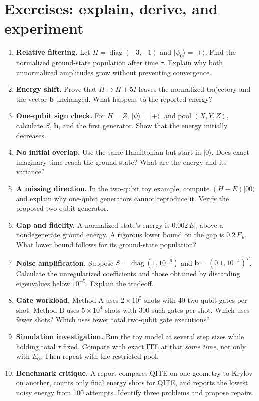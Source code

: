 \documentclass[11pt,a4paper]{article}
\newcommand{\ket}[1]{\lvert #1\rangle}
\newcommand{\Eh}{E_{\mathrm h}}
\newcommand{\lesson}[2]{\clearpage\section{#1}\label{#2}}
\begin{document}
\lesson{Exercises: explain, derive, and experiment}{sec:exercises}
\begin{enumerate}
\item \textbf{Relative filtering.} Let $H=\operatorname{diag}(-3,-1)$ and $\ket{\psi_0}=\ket{+}$. Find the normalized ground-state population after time $\tau$. Explain why both unnormalized amplitudes grow without preventing convergence.
\item \textbf{Energy shift.} Prove that $H\mapsto H+5I$ leaves the normalized trajectory and the vector $\bm b$ unchanged. What happens to the reported energy?
\item \textbf{One-qubit sign check.} For $H=Z$, $\ket{\psi}=\ket{+}$, and pool $(X,Y,Z)$, calculate $S$, $\bm b$, and the first generator. Show that the energy initially decreases.
\item \textbf{No initial overlap.} Use the same Hamiltonian but start in $\ket{0}$. Does exact imaginary time reach the ground state? What are the energy and its variance?
\item \textbf{A missing direction.} In the two-qubit toy example, compute $(H-E)\ket{00}$ and explain why one-qubit generators cannot reproduce it. Verify the proposed two-qubit generator.
\item \textbf{Gap and fidelity.} A normalized state's energy is $0.002\,\Eh$ above a nondegenerate ground energy. A rigorous lower bound on the gap is $0.2\,\Eh$. What lower bound follows for its ground-state population?
\item \textbf{Noise amplification.} Suppose $S=\operatorname{diag}(1,10^{-6})$ and $\bm b=(0.1,10^{-4})^T$. Calculate the unregularized coefficients and those obtained by discarding eigenvalues below $10^{-5}$. Explain the tradeoff.
\item \textbf{Gate workload.} Method A uses $2\times10^5$ shots with 40 two-qubit gates per shot. Method B uses $5\times10^4$ shots with 300 such gates per shot. Which uses fewer shots? Which uses fewer total two-qubit gate executions?
\item \textbf{Simulation investigation.} Run the toy model at several step sizes while holding total $\tau$ fixed. Compare with exact ITE at that \emph{same time}, not only with $E_0$. Then repeat with the restricted pool.
\item \textbf{Benchmark critique.} A report compares QITE on one geometry to Krylov on another, counts only final energy shots for QITE, and reports the lowest noisy energy from 100 attempts. Identify three problems and propose repairs.
\end{enumerate}
\end{document}
